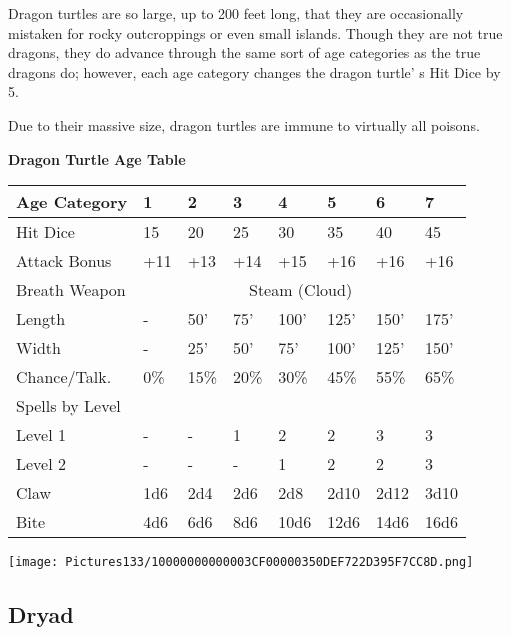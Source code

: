 \documentclass[a4paper,twoside,openany,10pt]{book}
\begin{document}
\begin{multicols}{2}
Dragon turtles are so large, up to 200 feet long, that they are occasionally mistaken for rocky outcroppings or even small islands. Though they are not true dragons, they do advance through the same sort of age categories as the true dragons do; however, each age category changes the dragon turtle' s Hit Dice by 5.

Due to their massive size, dragon turtles are immune to virtually all poisons.


\begin{center}
\textbf{Dragon Turtle Age Table}\\

\begin{tabularx}{0.47\textwidth}{@{}lXXXXXXX@{}}
Age Category & 1 & 2 & 3 & 4 & 5 & 6 & 7 \\\hline
Hit Dice & 15 & 20 & 25 & 30 & 35 & 40 & 45 \\\hline
Attack Bonus & +11 & +13 & +14 & +15 & +16 & +16 & +16 \\\hline
Breath Weapon & \multicolumn{7}{c}{Steam (Cloud)}\\\hline
Length & - & 50' & 75' & 100' & 125' & 150' & 175' \\\hline
Width & - & 25' & 50' & 75' & 100' & 125' & 150' \\\hline 
Chance/Talk. & 0\% & 15\% & 20\% & 30\% & 45\% & 55\% & 65\% \\\hline
Spells by Level & & & & & & & \\\hline
Level 1 & - & - & 1 & 2 & 2 & 3 & 3 \\\hline
Level 2 & - & - & - & 1 & 2 & 2 & 3 \\\hline
Claw & 1d6 & 2d4 & 2d6 & 2d8 & 2d10 & 2d12 & 3d10 \\\hline
Bite & 4d6 & 6d6 & 8d6 & 10d6 & 12d6 & 14d6 & 16d6 \\\hline
\end{tabularx}
\end{center}


\begin{center}
	\texttt{[image: Pictures133/10000000000003CF00000350DEF722D395F7CC8D.png]}	
\end{center}

\columnbreak

\subsection*{Dryad}\label{dryad}


\end{multicols}
\end{document}
